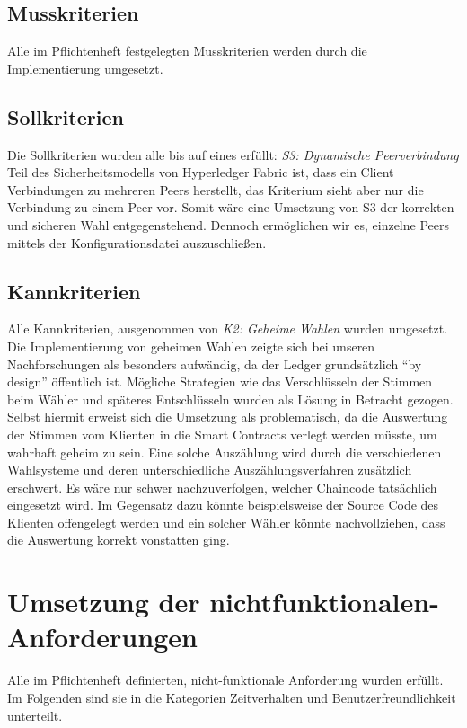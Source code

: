 \documentclass[parskip=full]{scrartcl}
\begin{document}
\subsection{Musskriterien}
Alle im Pflichtenheft festgelegten Musskriterien werden durch die Implementierung umgesetzt.

\subsection{Sollkriterien}
Die Sollkriterien wurden alle bis auf eines erfüllt:
\textit{S3: Dynamische Peerverbindung}\\
Teil des Sicherheitsmodells von Hyperledger Fabric ist, dass ein Client Verbindungen zu mehreren Peers herstellt, das Kriterium sieht aber nur die Verbindung zu einem Peer vor.
Somit wäre eine Umsetzung von S3 der korrekten und sicheren Wahl entgegenstehend. Dennoch ermöglichen wir es, einzelne Peers mittels der Konfigurationsdatei auszuschließen.  

\subsection{Kannkriterien}
Alle Kannkriterien, ausgenommen von \textit{K2: Geheime Wahlen} wurden umgesetzt. Die Implementierung von geheimen Wahlen zeigte sich bei unseren Nachforschungen als besonders aufwändig, da der Ledger grundsätzlich \enquote{by design} öffentlich ist. Mögliche Strategien wie das Verschlüsseln der Stimmen beim Wähler und späteres Entschlüsseln wurden als Lösung in Betracht gezogen. Selbst hiermit erweist sich die Umsetzung als problematisch, da die Auswertung der Stimmen vom Klienten in die Smart Contracts verlegt werden müsste, um wahrhaft geheim zu sein. Eine solche Auszählung wird durch die verschiedenen Wahlsysteme und deren unterschiedliche Auszählungsverfahren zusätzlich erschwert. Es wäre nur schwer nachzuverfolgen, welcher Chaincode tatsächlich eingesetzt wird. Im Gegensatz dazu könnte beispielsweise der Source Code des Klienten offengelegt werden und ein solcher Wähler könnte nachvollziehen, dass die Auswertung korrekt vonstatten ging.

\section{Umsetzung der nichtfunktionalen-Anforderungen}

Alle im Pflichtenheft definierten, nicht-funktionale Anforderung wurden erfüllt. Im Folgenden sind sie in die Kategorien Zeitverhalten und Benutzerfreundlichkeit unterteilt.
\end{document}
